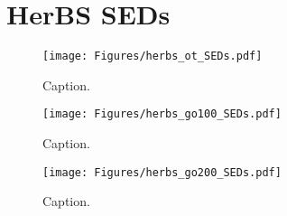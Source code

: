 \chapter{HerBS SEDs}

\begin{figure}
	\centering
	\texttt{[image: Figures/herbs\_ot\_SEDs.pdf]}
	\caption{Caption.}
\end{figure}

\begin{figure}
	\centering
	\texttt{[image: Figures/herbs\_go100\_SEDs.pdf]}
	\caption{Caption.}
\end{figure}

\begin{figure}
	\centering
	\texttt{[image: Figures/herbs\_go200\_SEDs.pdf]}
	\caption{Caption.}
\end{figure}